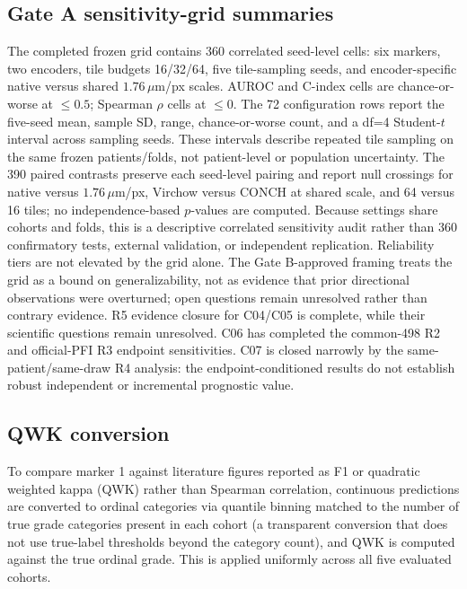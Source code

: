 \subsection{Gate A sensitivity-grid summaries}

The completed frozen grid contains 360 correlated seed-level cells: six markers, two encoders,
tile budgets 16/32/64, five tile-sampling seeds, and encoder-specific native versus shared
$1.76\,\mu$m/px scales. AUROC and C-index cells are chance-or-worse at $\leq0.5$; Spearman
$\rho$ cells at $\leq0$. The 72 configuration rows report the five-seed mean, sample SD,
range, chance-or-worse count, and a df=4 Student-$t$ interval across sampling seeds. These
intervals describe repeated tile sampling on the same frozen patients/folds, not patient-level
or population uncertainty. The 390 paired contrasts preserve each seed-level pairing and
report null crossings for native versus $1.76\,\mu$m/px, Virchow versus CONCH at shared scale,
and 64 versus 16 tiles; no independence-based $p$-values are computed. Because settings share
cohorts and folds, this is a descriptive correlated sensitivity audit rather than 360
confirmatory tests, external validation, or independent replication. Reliability tiers are
not elevated by the grid alone. The Gate B-approved framing treats the grid as a bound on
generalizability, not as evidence that prior directional observations were overturned; open
questions remain unresolved rather than contrary evidence. R5 evidence closure for C04/C05 is
complete, while their scientific questions remain unresolved. C06 has completed the
common-498 R2 and official-PFI R3 endpoint sensitivities. C07 is closed narrowly by the
same-patient/same-draw R4 analysis: the endpoint-conditioned results do not establish robust
independent or incremental prognostic value.

\subsection{QWK conversion}

To compare marker 1 against literature figures reported as F1 or quadratic weighted kappa
(QWK) rather than Spearman correlation, continuous predictions are converted to ordinal
categories via quantile binning matched to the number of true grade categories present in each
cohort (a transparent conversion that does not use true-label thresholds beyond the category
count), and QWK is computed against the true ordinal grade. This is applied uniformly across
all five evaluated cohorts.
